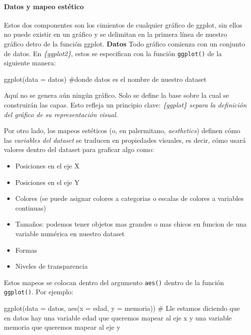 \documentclass[
  letterpaper,
  DIV=11,
  numbers=noendperiod,
  oneside]{scrreprt}
\let\oldparagraph\paragraph
\renewcommand{\paragraph}[1]{\oldparagraph{#1}\mbox{}}
\newenvironment{Shaded}{\begin{snugshade}}{\end{snugshade}}
\newcommand{\AttributeTok}[1]{\textcolor[rgb]{0.40,0.45,0.13}{#1}}
\newcommand{\CommentTok}[1]{\textcolor[rgb]{0.37,0.37,0.37}{#1}}
\newcommand{\FunctionTok}[1]{\textcolor[rgb]{0.28,0.35,0.67}{#1}}
\newcommand{\NormalTok}[1]{\textcolor[rgb]{0.00,0.23,0.31}{#1}}
\begin{document}
\hypertarget{datos-y-mapeo-estuxe9tico}{%
\paragraph{Datos y mapeo estético}\label{datos-y-mapeo-estuxe9tico}}

Estos dos componentes son los cimientos de cualquier gráfico de ggplot,
sin ellos no puede existir en un gráfico y se delimitan en la primera
línea de nuestro gráfico detro de la función ggplot. \textbf{Datos} Todo
gráfico comienza con un conjunto de datos. En \emph{\{ggplot2\}}, estos
se especifican con la función \texttt{ggplot()} de la siguiente manera:

\begin{Shaded}
\begin{Highlighting}[]
\FunctionTok{ggplot}\NormalTok{(}\AttributeTok{data =}\NormalTok{ datos)}
\CommentTok{\#donde datos es el nombre de nuestro dataset}
\end{Highlighting}
\end{Shaded}

Aquí no se genera aún ningún gráfico. Solo se define la base sobre la
cual se construirán las capas. Esto refleja un principio clave:
\emph{\{ggplot\} separa la definición del gráfico de su representación
visual}.

Por otro lado, los mapeos estéticos (o, en palermitano,
\emph{aesthetics}) definen cómo las \emph{variables del dataset} se
traducen en propiedades visuales, es decir, cómo usará valores dentro
del dataset para graficar algo como:

\begin{itemize}
\item
  Posiciones en el eje X
\item
  Posiciones en el eje Y
\item
  Colores (se puede asignar colores a categorias o escalas de colores a
  variables continuas)
\item
  Tamaños: podemos tener objetos mas grandes o mas chicos en funcion de
  una variable numérica en nuestro dataset
\item
  Formas
\item
  Niveles de transparencia
\end{itemize}

Estos mapeos se colocan dentro del argumento \texttt{aes()} dentro de la
función \texttt{ggplot()}. Por ejemplo:

\begin{Shaded}
\begin{Highlighting}[]
\FunctionTok{ggplot}\NormalTok{(}\AttributeTok{data =}\NormalTok{ datos, }\FunctionTok{aes}\NormalTok{(}\AttributeTok{x =}\NormalTok{ edad, }\AttributeTok{y =}\NormalTok{ memoria))}
\CommentTok{\# Lle estamos diciendo que en datos hay una variable edad que queremos mapear al eje x y una variable memoria que queremos mapear al eje y}
\end{Highlighting}
\end{Shaded}
\end{document}
